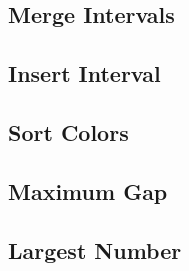     
\subsection{Merge Intervals}

\subsection{Insert Interval}

\subsection{Sort Colors}

\subsection{Maximum Gap}

\subsection{Largest Number}

